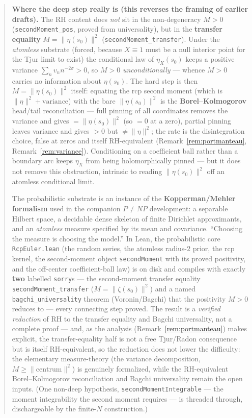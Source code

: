 \documentclass[11pt,a4paper]{article}
\theoremstyle{definition}
\newcommand{\etaX}{\eta_X}
\begin{document}
\begin{abstract}
\textbf{Where the deep step really is (this reverses the framing of earlier drafts).} The RH
content does \emph{not} sit in the non-degeneracy \(M>0\) (\texttt{secondMoment\_pos}, proved from
universality), but in the \textbf{transfer equality} \(M=\|\eta(s_0)\|^2\)
(\texttt{secondMoment\_transfer}). Under the \emph{atomless} substrate (forced, because
\(X\equiv1\) must be a null interior point for the Tjur limit to exist) the conditional law of
\(\etaX(s_0)\) keeps a positive variance \(\sum_n v_n n^{-2\sigma}>0\), so \(M>0\)
\emph{unconditionally} --- whence \(M>0\) carries no information about \(\eta(s_0)\). The hard step is
then \(M=\|\eta(s_0)\|^2\) itself: equating the rcp second moment (which is \(\|\eta\|^2+\text{variance}\))
with the bare \(\|\eta(s_0)\|^2\) is the \textbf{Borel--Kolmogorov} head/tail reconciliation --- full
pinning of all coordinates removes the variance and gives \(=\|\eta(s_0)\|^2\) (so \(=0\) at a zero),
partial pinning leaves variance and gives \(>0\) but \(\neq\|\eta\|^2\); the rate is the disintegration
choice, false at zeros and itself RH-equivalent (Remark~\ref{rem:portmanteau},
Remark~\ref{rem:variance}). Conditioning on a coefficient ball rather than a boundary arc keeps
\(\etaX\) from being holomorphically pinned --- but it does not remove this obstruction, intrinsic to
reading \(\|\eta(s_0)\|^2\) off an atomless conditional limit.

The probabilistic substrate is an instance of the \textbf{Kopperman/Mehler formalism}
used in the companion \(P\neq NP\) development: a separable Hilbert space, a decidable
dense skeleton of finite Dirichlet approximants, and an \emph{atomless} measure specified
by its mean and covariance. ``Choosing the measure is choosing the model.'' In Lean, the
probabilistic core \texttt{RcpEuler.lean} (the random series, the atomless radius-\(2\) prior,
the rcp kernel, the second-moment object \texttt{secondMoment} with its proved positivity, and
the off-center coefficient-ball law) is on disk and compiles with exactly \textbf{two} labelled
\texttt{sorry}s --- the second-moment transfer equality \texttt{secondMoment\_transfer}
(\(M=\|\zeta(s_0)\|^2\)) and a named \texttt{bagchi\_universality} theorem (Voronin/Bagchi) that the
positivity \(M>0\) reduces to --- every connecting step proved. The result is a \emph{verified
reduction} of RH to the transfer equality and Bagchi universality, not a complete proof --- and, as
the analysis (Remark~\ref{rem:portmanteau}) makes explicit, the transfer-equality half is not a free
Tjur/Radon consequence but is itself RH-equivalent, so the reduction does not lower the difficulty:
the elementary measure-theory (the variance decomposition, \(M\ge\|\text{centrum}\|^2\)) is genuinely
formalized, while the RH-equivalent Borel--Kolmogorov reconciliation and Bagchi universality remain the
open inputs. (One non-deep hypothesis, \texttt{secondMomentIntegrable} --- the moment integrability the
second moment requires --- is threaded through, dischargeable by the finite-\(N\) construction.)
\end{abstract}
\end{document}
